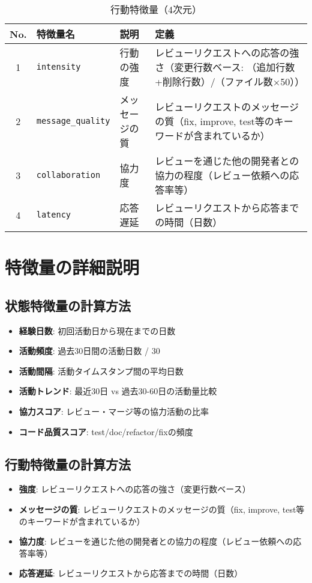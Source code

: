 \documentclass{article}
\begin{document}
\begin{table}[h]
\centering
\caption{行動特徴量（4次元）}
\begin{tabular}{@{}clll@{}}
\toprule
\textbf{No.} & \textbf{特徴量名} & \textbf{説明} & \textbf{定義} \\
\midrule
1 & \texttt{intensity} & 行動の強度 & レビューリクエストへの応答の強さ（変更行数ベース: （追加行数+削除行数）/（ファイル数×50）） \\
2 & \texttt{message\_quality} & メッセージの質 & レビューリクエストのメッセージの質（fix, improve, test等のキーワードが含まれているか） \\
3 & \texttt{collaboration} & 協力度 & レビューを通じた他の開発者との協力の程度（レビュー依頼への応答率等） \\
4 & \texttt{latency} & 応答遅延 & レビューリクエストから応答までの時間（日数） \\
\bottomrule
\end{tabular}
\end{table}

\section{特徴量の詳細説明}

\subsection{状態特徴量の計算方法}

\begin{itemize}
\item \textbf{経験日数}: 初回活動日から現在までの日数
\item \textbf{活動頻度}: 過去30日間の活動日数 / 30
\item \textbf{活動間隔}: 活動タイムスタンプ間の平均日数
\item \textbf{活動トレンド}: 最近30日 vs 過去30-60日の活動量比較
\item \textbf{協力スコア}: レビュー・マージ等の協力活動の比率
\item \textbf{コード品質スコア}: test/doc/refactor/fixの頻度
\end{itemize}

\subsection{行動特徴量の計算方法}

\begin{itemize}
\item \textbf{強度}: レビューリクエストへの応答の強さ（変更行数ベース）
\item \textbf{メッセージの質}: レビューリクエストのメッセージの質（fix, improve, test等のキーワードが含まれているか）
\item \textbf{協力度}: レビューを通じた他の開発者との協力の程度（レビュー依頼への応答率等）
\item \textbf{応答遅延}: レビューリクエストから応答までの時間（日数）
\end{itemize}
\end{document}

